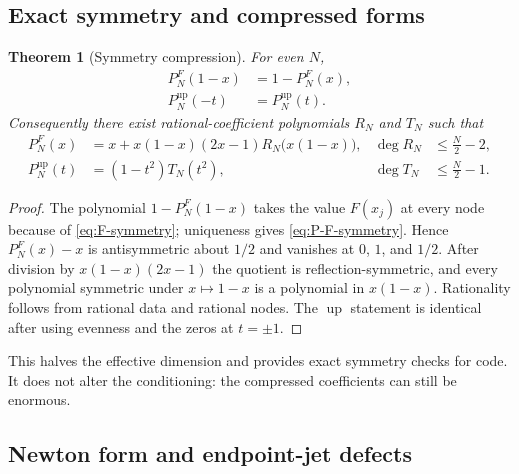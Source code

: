 \documentclass[11pt,oneside]{article}
\newtheorem{theorem}{Theorem}[section]
\theoremstyle{definition}
\theoremstyle{remark}
\newcommand{\Up}{\operatorname{up}}
\begin{document}
\subsection{Exact symmetry and compressed forms}

\begin{theorem}[Symmetry compression]
\label{thm:symmetry-compression}
For even $N$,
\begin{align}
 P_N^F(1-x)&=1-P_N^F(x),
 \label{eq:P-F-symmetry}\\
 P_N^{\Up}(-t)&=P_N^{\Up}(t).
 \label{eq:P-up-symmetry}
\end{align}
Consequently there exist rational-coefficient polynomials $R_N$ and $T_N$ such that
\begin{align}
 P_N^F(x)
 &=x+x(1-x)(2x-1)R_N\bigl(x(1-x)\bigr),
 &\deg R_N&\le \frac N2-2,
 \label{eq:F-compressed}\\
 P_N^{\Up}(t)
 &=(1-t^2)T_N(t^2),
 &\deg T_N&\le \frac N2-1.
 \label{eq:up-compressed}
\end{align}
\end{theorem}

\begin{proof}
The polynomial $1-P_N^F(1-x)$ takes the value $F(x_j)$ at every node because of
\eqref{eq:F-symmetry}; uniqueness gives \eqref{eq:P-F-symmetry}.  Hence
$P_N^F(x)-x$ is antisymmetric about $1/2$ and vanishes at $0$, $1$, and $1/2$.
After division by $x(1-x)(2x-1)$ the quotient is reflection-symmetric, and every polynomial
symmetric under $x\mapsto1-x$ is a polynomial in $x(1-x)$.  Rationality follows from
rational data and rational nodes.  The $\Up$ statement is identical after using evenness and
the zeros at $t=\pm1$.
\end{proof}

This halves the effective dimension and provides exact symmetry checks for code.  It does
not alter the conditioning: the compressed coefficients can still be enormous.

\subsection{Newton form and endpoint-jet defects}
\end{document}
